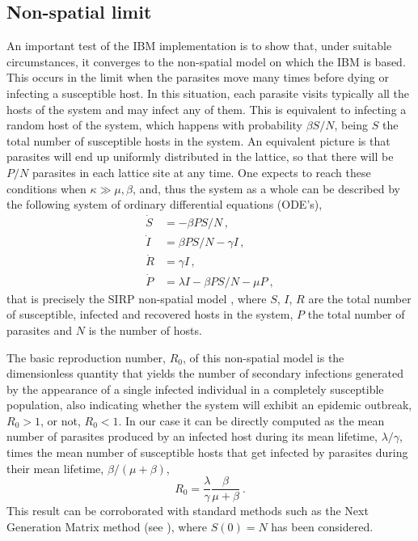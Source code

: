 \subsection{Non-spatial limit} \label{sec:MFlimit}
An important test of the IBM implementation is to show that, under suitable
circumstances, it converges to the non-spatial model on which the IBM is based.
This occurs in the limit when the parasites move many times before dying or
infecting a susceptible host. In this situation, each parasite visits typically
all the hosts of the system and may infect any of them. This is equivalent to
infecting a random host of the system, which happens with probability $\beta
    S/N$, being $S$ the total number of susceptible hosts in the system. An
equivalent picture is that parasites will end up uniformly distributed in the
lattice, so that there will be $P/N$ parasites in each lattice site at any
time. One expects to reach these conditions when $\kappa\gg\mu,\beta$, and,
thus the system as a whole can be described by the following system of ordinary
differential equations (ODE's),
\begin{equation}\label{eq:SIRP_MF}
    \begin{aligned}
        \dot{S} & =-\beta P S/N \, ,               \\
        \dot{I} & =\beta P S/N-\gamma I \, ,       \\
        \dot{R} & =\gamma I \, ,                   \\
        \dot{P} & =\lambda I-\beta P S/N-\mu P \ ,
    \end{aligned}
\end{equation}
that is precisely the SIRP non-spatial model \cite{GimenezRomero2021}, where
$S$, $I$, $R$ are the total number of susceptible, infected and recovered hosts
in the system, $P$ the total number of parasites and $N$ is the number of
hosts.

The basic reproduction number, $R_0$, of this non-spatial model is the
dimensionless quantity that yields the number of secondary infections generated
by the appearance of a single infected individual in a completely susceptible
population, also indicating whether the system will exhibit an epidemic
outbreak, $R_0>1$, or not, $R_0<1$.
In our case it can be directly computed as the mean number of parasites
produced by an infected host during its mean lifetime, $\lambda/\gamma$, times
the mean number of susceptible hosts that get infected by parasites during
their mean lifetime, $\beta/(\mu+\beta)$,
\begin{equation}\label{eq:R0_MF}
    R_0=\frac{\lambda}{\gamma}\frac{\beta}{\mu+\beta} \ .
\end{equation}
This result can be corroborated with standard methods such as the Next
Generation Matrix method \cite{Diekmann2010} (see \cite{GimenezRomero2021}),
where $S(0)=N$ has been considered.

